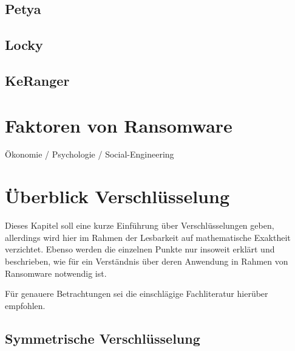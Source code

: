 		\subsection{Petya}
		\subsection{Locky}
		\subsection{KeRanger}


\section{Faktoren von Ransomware}
	Ökonomie / Psychologie / Social-Engineering

\section{Überblick Verschlüsselung}
Dieses Kapitel soll eine kurze Einführung über Verschlüsselungen geben, allerdings wird hier im Rahmen der Lesbarkeit auf mathematische Exaktheit verzichtet. Ebenso werden
die einzelnen Punkte nur insoweit erklärt und beschrieben, wie für ein Verständnis über deren Anwendung in Rahmen von Ransomware notwendig ist.

Für genauere Betrachtungen sei die einschlägige Fachliteratur hierüber empfohlen. %
\subsection{Symmetrische Verschlüsselung}
\label{sec:sym_verschl}

